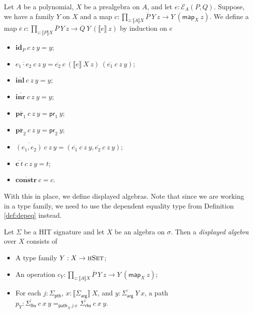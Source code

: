 \documentclass[9pt]{entcs}
\newcommand{\type}[1]{\textsc{#1}}
\newcommand{\constructor}[1]{\mathbf{#1}}
\newcommand{\nattranstxt}[1]{\mathsf{#1}}
\newcommand{\function}[1]{\mathsf{#1}}
\newcommand{\deprod}[3]{\prod_{#1 : #2} #3} %
\newcommand{\hset}{\type{hSet}} %
\newcommand{\0}{\textbf{0}} %
\newcommand{\1}{\textbf{1}} %
\newcommand{\depeq}[3]{#2 =_{#1} #3} %
\newcommand{\prlt}{\nattranstxt{pr}_1} %
\newcommand{\prrt}{\nattranstxt{pr}_2} %
\newcommand{\ep}[3]{\mathcal{E}_{#1}(#2,#3)} %
\newcommand{\id}[1]{\constructor{id}_{#1}} %
\newcommand{\comp}[2]{#1 \cdot #2} %
\newcommand{\inle}{\constructor{inl}} %
\newcommand{\inre}{\constructor{inr}} %
\newcommand{\prle}{\constructor{pr}_1} %
\newcommand{\prre}{\constructor{pr}_2} %
\newcommand{\pair}[2]{(#1 , #2)} %
\newcommand{\Ce}{\constructor{c}} %
\newcommand{\constr}{\constructor{constr}} %
\newcommand{\pthI}[0]{\textsf{pth}}
\newcommand{\pthA}[0]{\textsf{arg}}
\newcommand{\pthlh}[0]{\textsf{lhs}}
\newcommand{\pthrh}[0]{\textsf{rhs}}
\newcommand{\pathI}[1]{#1_{\pthI}} %
\newcommand{\pathA}[1]{#1_{\pthA}} %
\newcommand{\pathlh}[1]{#1_{\pthlh}} %
\newcommand{\pathrh}[1]{#1_{\pthrh}} %
\newcommand{\semP}[1]{\llbracket #1 \rrbracket} %
\newcommand{\semE}[1]{\llbracket #1 \rrbracket} %
\newcommand{\constrA}[1]{\function{map}_{#1}} %
\newcommand{\constrP}[1]{\function{path}_{#1}} %
\newcommand{\polydact}[2]{\overline{#1} \> #2} %
\newcommand{\epdact}[2]{\overline{#1} \> #2} %
\begin{document}
\begin{definition}
Let $A$ be a polynomial, $X$ be a prealgebra on $A$, and let $e : \ep{A}{P}{Q}$.
Suppose, we have a family $Y$ on $X$ and a map $c : \deprod{z}{\semP{A}{X}}{\polydact{P}{Y} \> z \rightarrow Y \> (\constrA{X} \> z)}$.
We define a map $\epdact{e}{c} : \deprod{z}{\semP{P}{X}}{\polydact{P}{Y} \> z \rightarrow \polydact{Q}{Y} \> (\semE{e} \> z)}$ by induction on $e$
\begin{itemize}
	\item $\epdact{\id{P}}{c} \> z \> y = y$;
	\item $\epdact{\comp{e_1}{e_2}}{c} \> z \> y = \epdact{e_2}{c} \> (\semE{e} \> X \> z) \> (\epdact{e_1}{c} \> z \> y)$;
	\item $\epdact{\inle}{c} \> z \> y = y$;
	\item $\epdact{\inre}{c} \> z \> y = y$;
	\item $\epdact{\prle}{c} \> z \> y = \prlt \> y$;
	\item $\epdact{\prre}{c} \> z \> y = \prrt \> y$;
	\item $\epdact{\pair{e_1}{e_2}}{c} \> z \> y = (\epdact{e_1}{c} \> z \> y , \epdact{e_2}{c} \> z \> y)$;
	\item $\epdact{\Ce \> t}{c} \> z \> y = t$;
	\item $\epdact{\constr}{c} = c$.
\end{itemize}
\end{definition}

With this in place, we define displayed algebras.
Note that since we are working in a type family, we need to use the dependent equality type from Definition \ref{def:depeq} instead.

\begin{definition}
Let $\Sigma$ be a HIT signature and let $X$ be an algebra on $\sigma$.
Then a \emph{displayed algebra} over $X$ consists of
\begin{itemize}
	\item A type family $Y : X \rightarrow \hset$;
	\item An operation $c_Y : \deprod{z}{\semP{A}{X}}{\polydact{P}{Y} \> z \rightarrow Y \> (\constrA{X} \> z)}$;
	\item For each $j : \pathI{\Sigma}$, $x : \semP{\pathA{\Sigma}} \> X$, and $y : \polydact{\pathA{\Sigma}}{Y} \> x$,  a path $p_Y : \depeq{\constrP{X} \> j \> x}{\epdact{\pathlh{\Sigma}}{c} \> x \> y}{\epdact{\pathrh{\Sigma}}{c} \> x \> y}$.
\end{itemize} 
\end{definition}
\end{document}
